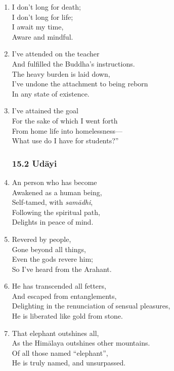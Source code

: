 \documentclass[10pt, openany]{book}
\begin{document}
\begin{enumerate}
\item I don’t long for death;\\
I don’t long for life;\\
I await my time,\\
Aware and mindful.

\item I’ve attended on the teacher\\
And fulfilled the Buddha’s instructions.\\
The heavy burden is laid down,\\
I’ve undone the attachment to being reborn \\
In any state of existence.

\item I’ve attained the goal\\
For the sake of which I went forth\\
From home life into homelessness—\\
What use do I have for students?”

\subsubsection*{15.2 Udāyi}

\item An person who has become \\
Awakened as a human being,\\
Self-tamed, with \emph{samādhi},\\
Following the spiritual path,\\
Delights in peace of mind.

\item Revered by people,\\
Gone beyond all things,\\
Even the gods revere him;\\
So I’ve heard from the Arahant.

\item He has transcended all fetters,\\
And escaped from entanglements,\\
Delighting in the renunciation of sensual pleasures,\\
He is liberated like gold from stone.

\item That elephant outshines all,\\
As the Himālaya outshines other mountains.\\
Of all those named “elephant”,\\
He is truly named, and unsurpassed.


\end{enumerate}
\end{document}
